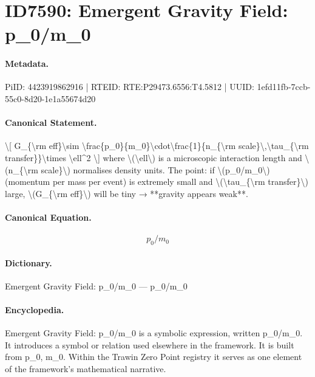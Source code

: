 \section*{ID7590: Emergent Gravity Field: p\_0/m\_0}
\paragraph{Metadata.}
PiID: 4423919862916 | RTEID: RTE:P29473.6556:T4.5812 | UUID: 1efd11fb-7ccb-55c0-8d20-1e1a55674d20

\paragraph{Canonical Statement.}
\textbackslash{}[ G\_\{\textbackslash{}rm eff\}\textbackslash{}sim \textbackslash{}frac\{p\_0\}\{m\_0\}\textbackslash{}cdot\textbackslash{}frac\{1\}\{n\_\{\textbackslash{}rm scale\}\textbackslash{},\textbackslash{}tau\_\{\textbackslash{}rm transfer\}\}\textbackslash{}times \textbackslash{}ell\textasciicircum{}2 \textbackslash{}] where \textbackslash{}(\textbackslash{}ell\textbackslash{}) is a microscopic interaction length and \textbackslash{}(n\_\{\textbackslash{}rm scale\}\textbackslash{}) normalises density units. The point: if \textbackslash{}(p\_0/m\_0\textbackslash{}) (momentum per mass per event) is extremely small and \textbackslash{}(\textbackslash{}tau\_\{\textbackslash{}rm transfer\}\textbackslash{}) large, \textbackslash{}(G\_\{\textbackslash{}rm eff\}\textbackslash{}) will be tiny → **gravity appears weak**.

\paragraph{Canonical Equation.}
\[
p_0/m_0
\]

\paragraph{Dictionary.}
Emergent Gravity Field: p\_0/m\_0 — p\_0/m\_0

\paragraph{Encyclopedia.}
Emergent Gravity Field: p\_0/m\_0 is a symbolic expression, written p\_0/m\_0. It introduces a symbol or relation used elsewhere in the framework. It is built from p\_0, m\_0. Within the Trawin Zero Point registry it serves as one element of the framework's mathematical narrative.
